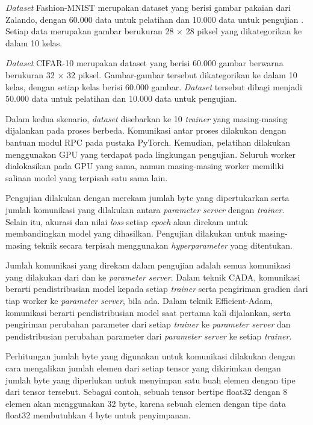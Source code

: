 \emph{Dataset} Fashion-MNIST merupakan dataset yang berisi gambar pakaian dari Zalando, dengan 60.000 data untuk pelatihan dan 10.000 data untuk pengujian \parencite{xiao2017fashion}. Setiap data merupakan gambar berukuran 28 $\times$ 28 piksel yang dikategorikan ke dalam 10 kelas.

\emph{Dataset} CIFAR-10 merupakan dataset yang berisi 60.000 gambar berwarna berukuran 32 $\times$ 32 piksel. Gambar-gambar tersebut dikategorikan ke dalam 10 kelas, dengan setiap kelas berisi 60.000 gambar. \emph{Dataset} tersebut dibagi menjadi 50.000 data untuk pelatihan dan 10.000 data untuk pengujian.

Dalam kedua skenario, \emph{dataset} disebarkan ke 10 \emph{trainer} yang masing-masing dijalankan pada proses berbeda. Komunikasi antar proses dilakukan dengan bantuan modul RPC pada pustaka PyTorch. Kemudian, pelatihan dilakukan menggunakan GPU yang terdapat pada lingkungan pengujian. Seluruh worker dialokasikan pada GPU yang sama, namun masing-masing worker memiliki salinan model yang terpisah satu sama lain.

Pengujian dilakukan dengan merekam jumlah byte yang dipertukarkan serta jumlah komunikasi yang dilakukan antara \emph{parameter server} dengan \emph{trainer}. Selain itu, akurasi dan nilai \emph{loss} setiap \emph{epoch} akan direkam untuk membandingkan model yang dihasilkan. Pengujian dilakukan untuk masing-masing teknik secara terpisah menggunakan \emph{hyperparameter} yang ditentukan.

Jumlah komunikasi yang direkam dalam pengujian adalah semua komunikasi yang dilakukan dari dan ke \emph{parameter server}. Dalam teknik CADA, komunikasi berarti pendistribusian model kepada setiap \emph{trainer} serta pengiriman gradien dari tiap worker ke \emph{parameter server}, bila ada. Dalam teknik Efficient-Adam, komunikasi berarti pendistribusian model saat pertama kali dijalankan, serta pengiriman perubahan parameter dari setiap \emph{trainer} ke \emph{parameter server} dan pendistribusian perubahan parameter dari \emph{parameter server} ke setiap \emph{trainer}.

Perhitungan jumlah byte yang digunakan untuk komunikasi dilakukan dengan cara mengalikan jumlah elemen dari setiap tensor yang dikirimkan dengan jumlah byte yang diperlukan untuk menyimpan satu buah elemen dengan tipe dari tensor tersebut. Sebagai contoh, sebuah tensor bertipe float32 dengan 8 elemen akan menggunakan 32 byte, karena sebuah elemen dengan tipe data float32 membutuhkan 4 byte untuk penyimpanan.

